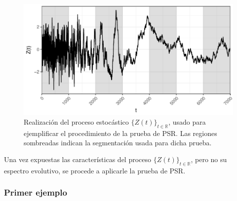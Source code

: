\documentclass[12pt,letterpaper]{book}
\newcommand{\R}{\mathbb{R}}
\begin{document}
\begin{figure}
\centering
\includegraphics[width=0.9\linewidth]{./scripts_graf_res/proceso_Z.pdf}
\caption[Realización de un proceso estocástico, usado para ejemplificar la prueba de PSR.]{Realización del proceso estocástico $\{Z(t)\}_{t\in\R}$, usado para ejemplificar el procedimiento de la prueba de PSR.
Las regiones sombreadas indican la segmentación usada para dicha prueba.}
\label{fig:lazy21}
\end{figure}

Una vez expuestas las características del proceso $\{Z(t)\}_{t\in\R}$, pero no su espectro evolutivo, se procede a aplicarle la prueba de PSR.


\subsubsection{Primer ejemplo}
\end{document}
